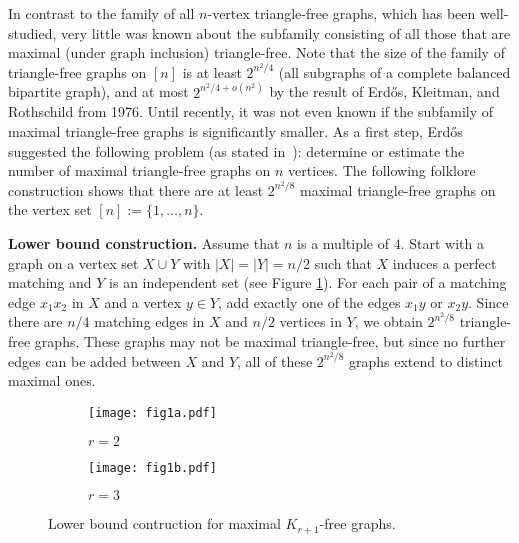 \documentclass[12pt]{article}
\theoremstyle{definition}
\theoremstyle{definition}
\theoremstyle{definition}
\theoremstyle{definition}
\theoremstyle{definition}
\theoremstyle{definition}
\theoremstyle{definition}
\newcommand{\3}{\bf{3}}
\begin{document}
In contrast to the family of all $n$-vertex triangle-free graphs, which has been well-studied, very little was known about the subfamily consisting of all those that are maximal (under graph inclusion) triangle-free. Note that the size of the family of triangle-free graphs on $[n]$ is at least $2^{n^2/4}$ (all subgraphs of a complete balanced bipartite graph), and at most $2^{n^2/4+o(n^2)}$ by the result of Erd\H{o}s, Kleitman, and Rothschild from 1976. Until recently, it was not even known if the subfamily of maximal triangle-free graphs is significantly smaller. As a first step, Erd\H{o}s suggested the following problem (as stated in~\cite{Simonovits}): determine or estimate the number of maximal triangle-free graphs on $n$ vertices. The following folklore construction shows that there are at least $2^{n^2/8}$  maximal triangle-free graphs on the vertex set $[n]:=\{1,\dots,n\}$. 

\medskip

\noindent\textbf{Lower bound construction.} 
Assume that $n$ is a multiple of $4$. Start with a graph on a vertex set $X\cup Y$ with $|X|=|Y|=n/2$ such that $X$ induces a perfect matching and $Y$ is an independent set (see Figure \ref{fig1a}). For each pair of a matching edge $x_1 x_2$ in $X$ and a vertex $y\in Y$, add exactly one of the edges $x_1 y$ or $x_2 y$. Since there are $n/4$ matching edges in $X$ and $n/2$ vertices in $Y$, we obtain $2^{n^2/8}$ triangle-free graphs. These graphs may not be maximal triangle-free, but since no further edges can be added between $X$ and $Y$, all of these $2^{n^2/8}$ graphs extend to distinct maximal ones.

\begin{figure*}[t!]
    \centering
    \begin{subfigure}[t]{0.4\textwidth}
        \centering
        \texttt{[image: fig1a.pdf]}
        \caption{$r=2$}\label{fig1a}
    \end{subfigure}%
    \hspace{1cm}
        \begin{subfigure}[t]{0.4\textwidth}
        \centering
        \texttt{[image: fig1b.pdf]}
        \caption{$r=3$}\label{fig1b}
    \end{subfigure}
   \caption{Lower bound contruction for maximal $K_{r+1}$-free graphs.}
\end{figure*}

\medskip
\end{document}
